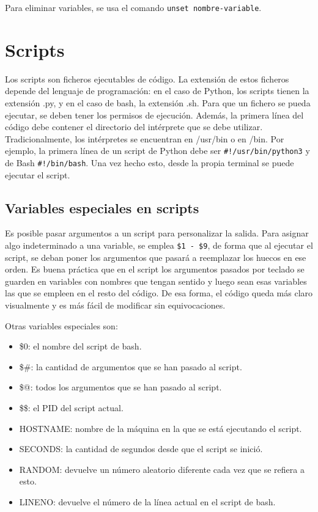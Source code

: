Para eliminar variables, se usa el comando \texttt{unset nombre-variable}.  \ 

\section{Scripts}
Los scripts son ficheros ejecutables de código. La extensión de estos ficheros depende del lenguaje de programación: en el caso de Python, los scripts tienen la extensión .py, y en el caso de bash, la extensión .sh. Para que un fichero se pueda ejecutar, se deben tener los permisos de ejecución. Además, la primera línea del código debe contener el directorio del intérprete que se debe utilizar. Tradicionalmente, los intérpretes se encuentran en /usr/bin o en /bin. Por ejemplo, la primera línea de un script de Python debe ser \texttt{\#!/usr/bin/python3} y de Bash \texttt{\#!/bin/bash}. Una vez hecho esto, desde la propia terminal se puede ejecutar el script.

\subsection{Variables especiales en scripts}
Es posible pasar argumentos a un script para personalizar la salida. Para asignar algo indeterminado a una variable, se emplea \texttt{\$1 - \$9}, de forma que al ejecutar el script, se deban poner los argumentos que pasará a reemplazar los huecos en ese orden. Es buena práctica que en el script los argumentos pasados por teclado se guarden en variables con nombres que tengan sentido y luego sean esas variables las que se empleen en el resto del código. De esa forma, el código queda más claro visualmente y es más fácil de modificar sin equivocaciones.

Otras variables especiales son: \begin{itemize}
\item \$0: el nombre del script de bash.
\item \$\#: la cantidad de argumentos que se han pasado al script.
\item \$@: todos los argumentos que se han pasado al script.
\item \$\$: el PID del script actual.
\item HOSTNAME: nombre de la máquina en la que se está ejecutando el script. 
\item SECONDS: la cantidad de segundos desde que el script se inició. 
\item RANDOM: devuelve un número aleatorio diferente cada vez que se refiera a esto.
\item LINENO: devuelve el número de la línea actual en el script de bash.
\end{itemize}
